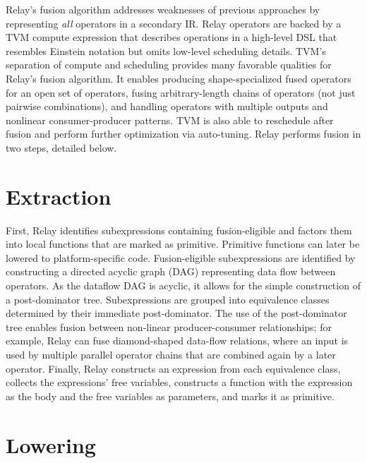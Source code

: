 Relay's fusion algorithm addresses weaknesses of previous approaches by representing
  \textit{all} operators in a secondary IR.
Relay operators are backed by a TVM compute expression that
  describes operations in a high-level DSL that resembles Einstein notation
  but omits low-level scheduling details.
TVM's separation of compute and scheduling provides many favorable qualities
  for Relay's fusion algorithm.
It enables producing shape-specialized fused operators for an open set of operators,
  fusing arbitrary-length chains of operators (not just pairwise combinations),
  and handling operators with multiple outputs and nonlinear consumer-producer patterns.
TVM is also able to reschedule after fusion and perform further optimization via auto-tuning.
Relay performs fusion in two steps, detailed below.

\section{Extraction}

First, Relay identifies subexpressions containing
  fusion-eligible and factors them into local functions that
  are marked as primitive.
Primitive functions can later be lowered to platform-specific
  code.
Fusion-eligible subexpressions are identified by constructing a
  directed acyclic graph (DAG) representing data flow between operators.
As the dataflow DAG is acyclic, it allows for the simple construction
  of a post-dominator tree.
Subexpressions are grouped into equivalence classes
  determined by their immediate post-dominator.
The use of the post-dominator tree enables fusion
  between non-linear producer-consumer relationships;
  for example, Relay can fuse diamond-shaped data-flow relations,
  where an input is used by multiple parallel operator chains
  that are combined again by a later operator.
Finally, Relay constructs an expression from each equivalence class,
  collects the expressions' free variables,
  constructs a function with the expression as the body and the free variables
  as parameters,
  and marks it as primitive.

\section{Lowering}

